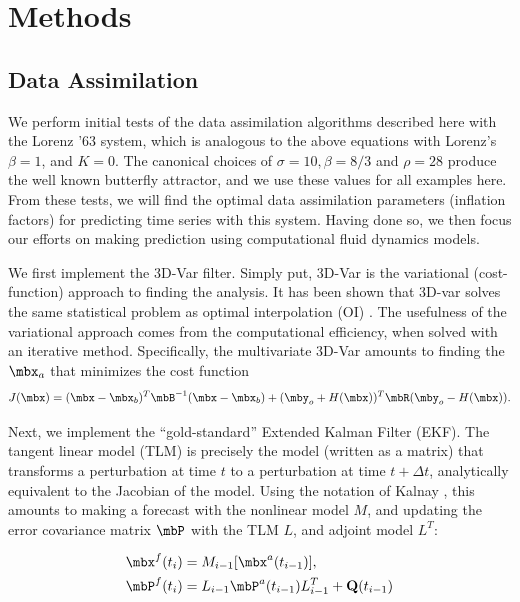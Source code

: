 \section*{Methods}

\subsection*{Data Assimilation}

We perform initial tests of the data assimilation algorithms described here with the Lorenz '63 system, which is analogous to the above equations with Lorenz's $\beta = 1$, and $K = 0$.
The canonical choices of $\sigma = 10, \beta = 8/3$ and $\rho = 28$ produce the well known butterfly attractor, and we use these values for all examples here.
From these tests, we will find the optimal data assimilation parameters (inflation factors) for predicting time series with this system.
Having done so, we then focus our efforts on making prediction using computational fluid dynamics models.

We first implement the 3D-Var filter.
Simply put, 3D-Var is the variational (cost-function) approach to finding the analysis.
It has been shown that 3D-var solves the same statistical problem as optimal interpolation (OI) \cite{lorenc1986analysis}.
The usefulness of the variational approach comes from the computational efficiency, when solved with an iterative method.
Specifically, the multivariate 3D-Var amounts to finding the $\mbx _a$ that minimizes the cost function
\begin{equation} J(\mbx) = (\mbx - \mbx_b) ^T \mbB ^{-1} (\mbx - \mbx_b) + (\mby_o + H(\mbx))^T\mbR (\mby_o - H(\mbx)) .\end{equation}

Next, we implement the ``gold-standard'' Extended Kalman Filter (EKF).
The tangent linear model (TLM) is precisely the model (written as a matrix) that transforms a perturbation at time $t$ to a perturbation at time $t+\Delta t$, analytically equivalent to the Jacobian of the model.
Using the notation of Kalnay \cite{kalnay2003}, this amounts to making a forecast with the nonlinear model $M$, and updating the error covariance matrix $\mbP$ with the TLM $L$, and adjoint model $L^T$:

\begin{align*} \mbx^f (t_i) &= M _{i-1} [\mbx ^a (t_{i-1} ) ],\\
\mbP^f (t_i ) &= L_{i-1} \mbP^a (t_{i-1} ) L^T _{i-1} + \mathbf{Q} (t_{i-1} ) \end{align*}

